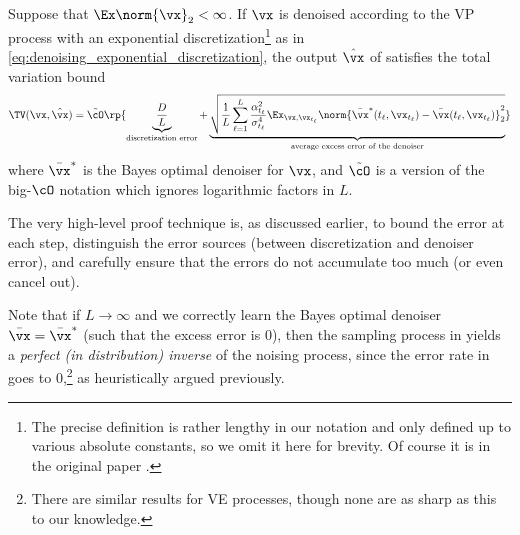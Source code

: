 \documentclass[../../book-main.tex]{subfiles}
\begin{document}
\begin{theorem}\label{thm:diffusion_sampler_convergence}
	Suppose that \(\Ex\norm{\vx}_{2} < \infty\).  If \(\vx\) is denoised according to the VP process with an exponential discretization\footnote{The precise definition is rather lengthy in our notation and only defined up to various absolute constants, so we omit it here for brevity. Of course it is in the original paper \citep{li2024d}.} as in \eqref{eq:denoising_exponential_discretization}, the output \(\hat{\vx}\) of  satisfies the total variation bound
	\begin{equation}\label{eq:diffusion_sampling_error}
		\TV(\vx, \hat{\vx}) = \tilde{\cO}\rp{\underbrace{\frac{D}{L}}_{\text{discretization error}} + \underbrace{\sqrt{\frac{1}{L}\sum_{\ell = 1}^{L}\frac{\alpha_{t_{\ell}}^{2}}{\sigma_{t_{\ell}}^{4}}\Ex_{\vx, \vx_{t_{\ell}}}\norm{\bar{\vx}^{\ast}(t_{\ell}, \vx_{t_{\ell}}) - \bar{\vx}(t_{\ell}, \vx_{t_{\ell}})}_{2}^{2}}}_{\text{average excess error of the denoiser}}}
	\end{equation}
	where \(\bar{\vx}^{\ast}\) is the Bayes optimal denoiser for \(\vx\), and \(\tilde{\cO}\) is a version of the big-\(\cO\) notation which ignores logarithmic factors in \(L\).
\end{theorem}
The very high-level proof technique is, as discussed earlier, to bound the error at each step, distinguish the error sources (between discretization and denoiser error), and carefully ensure that the errors do not accumulate too much (or even cancel out). 

Note that if \(L \to \infty\) and we correctly learn the Bayes optimal denoiser \(\bar{\vx} = \bar{\vx}^{\ast}\) (such that the excess error is \(0\)), then the sampling process in  yields a \textit{perfect (in distribution) inverse} of the noising process, since the error rate in  goes to \(0\),\footnote{There are similar results for VE processes, though none are as sharp as this to our knowledge.} as heuristically argued previously.
\end{document}
